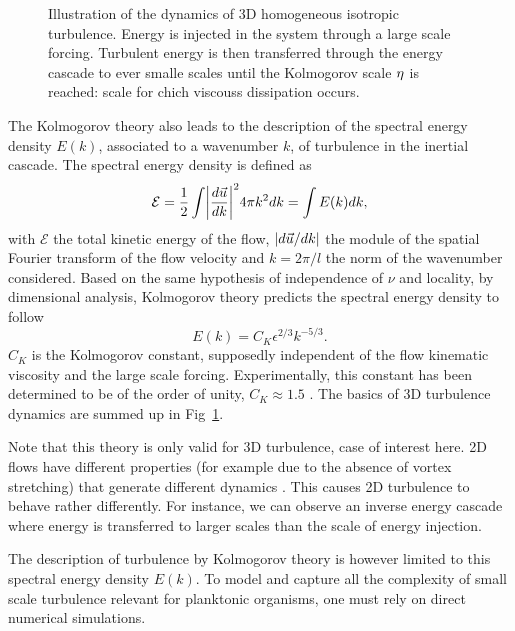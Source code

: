 \begin{figure}
	\centering
	\def\svgwidth{0.7\textwidth}
	
  	\caption[Illustration of the dynamics of 3D homogeneous isotropic turbulence.]{
  		Illustration of the dynamics of 3D homogeneous isotropic turbulence.
  		Energy is injected in the system through a large scale forcing.
  		Turbulent energy is then transferred through the energy cascade to ever smalle scales until the Kolmogorov scale $\KolmogorovScale$ is reached: scale for chich viscouss dissipation occurs.
  	}
  	\label{fig:turbulence_spectrum}
\end{figure}
The Kolmogorov theory also leads to the description of the spectral energy density $E(k)$, associated to a wavenumber $k$, of turbulence in the inertial cascade.
The spectral energy density is defined as
\begin{equation}\label{eq:spectral_density}
	\mathcal{E} = \frac{1}{2} \int \norm*{\frac{d\FlowVelocity}{dk}}^2 4\pi k^2 dk = \int E(k) dk,
\end{equation}
with $\mathcal{E}$ the total kinetic energy of the flow, $\norm*{d\FlowVelocity/dk}$ the module of the spatial Fourier transform of the flow velocity and $k = 2\pi/l$ the norm of the wavenumber considered.
Based on the same hypothesis of independence of $\nu$ and locality, by dimensional analysis, Kolmogorov theory predicts the spectral energy density to follow
\begin{equation}\label{eq:kolmogorov_spectrum}
	E(k) = C_{K} \epsilon^{2/3} k^{-5/3}.
\end{equation}
$C_{K}$ is the Kolmogorov constant, supposedly independent of the flow kinematic viscosity and the large scale forcing.
Experimentally, this constant has been determined to be of the order of unity, $C_{K} \approx 1.5$ \citep{sreenivasan1995universality}.
The basics of 3D turbulence dynamics are summed up in Fig~\ref{fig:turbulence_spectrum}.

Note that this theory is only valid for 3D turbulence, case of interest here. 
2D flows have different properties (for example due to the absence of vortex stretching) that generate different dynamics .
This causes 2D turbulence to behave rather differently. 
For instance, we can observe an inverse energy cascade where energy is transferred to larger scales than the scale of energy injection.

The description of turbulence by Kolmogorov theory is however limited to this spectral energy density $E(k)$.
To model and capture all the complexity of small scale turbulence relevant for planktonic organisms, one must rely on direct numerical simulations.

